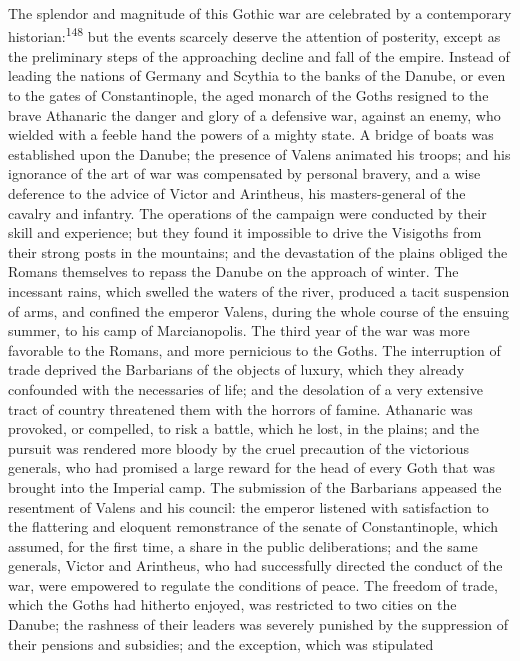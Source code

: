 {{{{{{{{{{{{{{{{{{{{{{{{{{{{{{{{{{{{{{{{{{{{{{{{{{{{{{{{{{{{{{{{{{{{{{{{{{{{{{{{{{{{{{{{{{{{{{{{{{{{{{{{{{{{{{{{{{{{{{{{{{{{{{{{{{{{{{{{{{{{{{{{{{{{{{{{{{{{{{{{{{{{{{The splendor and magnitude of this Gothic war are celebrated by a
contemporary historian:\textsuperscript{148} but the events scarcely deserve the
attention of posterity, except as the preliminary steps of the
approaching decline and fall of the empire. Instead of leading
the nations of Germany and Scythia to the banks of the Danube, or
even to the gates of Constantinople, the aged monarch of the
Goths resigned to the brave Athanaric the danger and glory of a
defensive war, against an enemy, who wielded with a feeble hand
the powers of a mighty state. A bridge of boats was established
upon the Danube; the presence of Valens animated his troops; and
his ignorance of the art of war was compensated by personal
bravery, and a wise deference to the advice of Victor and
Arintheus, his masters-general of the cavalry and infantry. The
operations of the campaign were conducted by their skill and
experience; but they found it impossible to drive the Visigoths
from their strong posts in the mountains; and the devastation of
the plains obliged the Romans themselves to repass the Danube on
the approach of winter. The incessant rains, which swelled the
waters of the river, produced a tacit suspension of arms, and
confined the emperor Valens, during the whole course of the
ensuing summer, to his camp of Marcianopolis. The third year of
the war was more favorable to the Romans, and more pernicious to
the Goths. The interruption of trade deprived the Barbarians of
the objects of luxury, which they already confounded with the
necessaries of life; and the desolation of a very extensive tract
of country threatened them with the horrors of famine. Athanaric
was provoked, or compelled, to risk a battle, which he lost, in
the plains; and the pursuit was rendered more bloody by the cruel
precaution of the victorious generals, who had promised a large
reward for the head of every Goth that was brought into the
Imperial camp. The submission of the Barbarians appeased the
resentment of Valens and his council: the emperor listened with
satisfaction to the flattering and eloquent remonstrance of the
senate of Constantinople, which assumed, for the first time, a
share in the public deliberations; and the same generals, Victor
and Arintheus, who had successfully directed the conduct of the
war, were empowered to regulate the conditions of peace. The
freedom of trade, which the Goths had hitherto enjoyed, was
restricted to two cities on the Danube; the rashness of their
leaders was severely punished by the suppression of their
pensions and subsidies; and the exception, which was stipulated
}}}}}}}}}}}}}}}}}}}}}}}}}}}}}}}}}}}}}}}}}}}}}}}}}}}}}}}}}}}}}}}}}}}}}}}}}}}}}}}}}}}}}}}}}}}}}}}}}}}}}}}}}}}}}}}}}}}}}}}}}}}}}}}}}}}}}}}}}}}}}}}}}}}}}}}}}}}}}}}}}}}}}}
